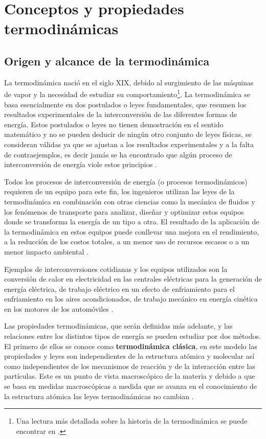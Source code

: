 \documentclass[../master.tex]{subfiles}
\begin{document}
\section{Conceptos y propiedades termodinámicas}

\subsection{Origen y alcance de la termodinámica}

La termodinámica nació en el siglo XIX, debido al surgimiento de las máquinas de vapor y la necesidad de estudiar su comportamiento\footnote{Una lectura más detallada sobre la historia de la termodinámica se puede encontrar en \cite{clavell}.}. La termodinámica se basa esencialmente en dos postulados o leyes fundamentales, que resumen los resultados experimentales de la interconversión de las diferentes formas de energía. Estos postulados o leyes no tienen demostración en el sentido matemático y no se pueden deducir de ningún otro conjunto de leyes físicas, se consideran válidas ya que se ajustan a los resultados experimentales y a la falta de contraejemplos, es decir jamás se ha encontrado que algún proceso de interconversión de energía viole estos principios \parencites{glasstone}{smith-vanness}.

Todos los procesos de interconversión de energía (o procesos termodinámicos) requieren de un equipo para este fin, los ingenieros utilizan las leyes de la termodinámica en combinación con otras ciencias como la mecánica de fluidos y los fenómenos de transporte para analizar, diseñar y optimizar estos equipos donde se transforma la energía de un tipo a otra. El resultado de la aplicación de la termodinámica en estos equipos puede conllevar una mejora en el rendimiento, a la reducción de los costos totales, a un menor uso de recursos escasos o a un menor impacto ambiental \parencites{wark}{moranshapiro}.

Ejemplos de interconversiones cotidianas y los equipos utilizados son la conversión de calor en electricidad en las centrales eléctricas para la generación de energía eléctrica, de trabajo eléctrico en un efecto de enfriamiento para el enfriamiento en los aires acondicionados, de trabajo mecánico en energía cinética en los motores de los automóviles \parencite{faires}.

Las propiedades termodinámicas, que serán definidas más adelante, y las relaciones entre los distintos tipos de energía se pueden estudiar por dos métodos. El primero de ellos se conoce como \textbf{termodinámica clásica}, en este modelo las propiedades y leyes son independientes de la estructura atómica y molecular así como independientes de los mecanismos de reacción y de la interacción entre las partículas. Este es un punto de vista macroscópico de la materia y debido a que se basa en medidas macroscópicas a medida que se avanza en el conocimiento de la estructura atómica las leyes termodinámicas no cambian \parencites{faires}{glasstone}{wark}.
\end{document}
